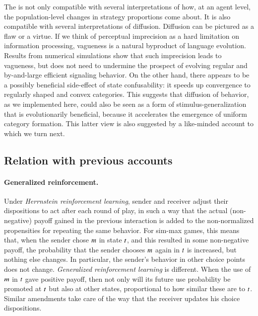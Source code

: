 \documentclass[fleqn,reqno,10pt]{article}
\newcommand{\rdd}{\acro{rdd}} %
\begin{document}
The \rdd is not only compatible with several interpretations of how,
at an agent level, the population-level changes in strategy
proportions come about. It is also compatible with several
interpretations of diffusion. Diffusion can be pictured as a flaw or a
virtue. If we think of perceptual imprecision as a hard limitation on
information processing, vagueness is a natural byproduct of language
evolution. Results from numerical simulations show that such
imprecision leads to vagueness, but does not need to undermine the
prospect of evolving regular and by-and-large efficient signaling
behavior. On the other hand, there appears to be a possibly beneficial
side-effect of state confusability: it speeds up convergence to
regularly shaped and convex categories. This suggests that diffusion
of behavior, as we implemented here, could also be seen as a form
of stimulus-generalization that is evolutionarily beneficial, because
it accelerates the emergence of uniform category formation. This
latter view is also suggested by a like-minded account to which we
turn next.

\subsection{Relation with previous accounts}
\label{sec:relat-with-prev}

\paragraph{Generalized reinforcement.}

Under \emph{Herrnstein reinforcement learning}, sender and receiver
adjust their dispositions to act after each round of play, in such a
way that the actual (non-negative) payoff gained in the previous
interaction is added to the non-normalized propensities for repeating
the same behavior. For sim-max games, this means that, when the sender
chose $m$ in state $t$, and this resulted in some
non-negative payoff, the probability that the sender chooses $m$
again in $t$ is increased, but nothing else changes. In
particular, the sender's behavior in other choice points does not
change. \emph{Generalized reinforcement learning} is different. When
the use of $m$ in $t$ gave positive payoff, then not only
will its future use probability be promoted at $t$ but also at
other states, proportional to how similar these are to
$t$. Similar amendments take care of the way that the receiver
updates his choice dispositions.
\end{document}
